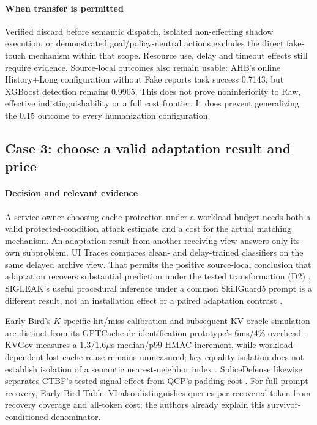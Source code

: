 \paragraph{When transfer is permitted}
Verified discard before semantic dispatch, isolated non-effecting shadow execution, or demonstrated goal/policy-neutral actions excludes the direct fake-touch mechanism within that scope. Resource use, delay and timeout effects still require evidence. Source-local outcomes also remain usable: AHB's online History+Long configuration without Fake reports task success 0.7143, but XGBoost detection remains 0.9905. This does not prove noninferiority to Raw, effective indistinguishability or a full cost frontier. It does prevent generalizing the 0.15 outcome to every humanization configuration.

\subsection{Case 3: choose a valid adaptation result and price}
\paragraph{Decision and relevant evidence}
A service owner choosing cache protection under a workload budget needs both a valid protected-condition attack estimate and a cost for the actual matching mechanism. An adaptation result from another receiving view answers only its own subproblem. UI Traces compares clean- and delay-trained classifiers on the same delayed archive view. That permits the positive source-local conclusion that adaptation recovers substantial prediction under the tested transformation (D2) \cite{uitraces2026}. SIGLEAK's useful procedural inference under a common SkillGuard5 prompt is a different result, not an installation effect or a paired adaptation contrast \cite{geng2026sigleak}.

Early Bird's $K$-specific hit/miss calibration and subsequent KV-oracle simulation are distinct from its GPTCache de-identification prototype's 6ms/4\% overhead \cite{earlybird2025}. KVGov measures a 1.3/1.6$\mu$s median/p99 HMAC increment, while workload-dependent lost cache reuse remains unmeasured; key-equality isolation does not establish isolation of a semantic nearest-neighbor index \cite{addagada2026kvgov}. SpliceDefense likewise separates CTBF's tested signal effect from QCP's padding cost \cite{spliceleak2026}. For full-prompt recovery, Early Bird Table~VI also distinguishes queries per recovered token from recovery coverage and all-token cost; the authors already explain this survivor-conditioned denominator.

